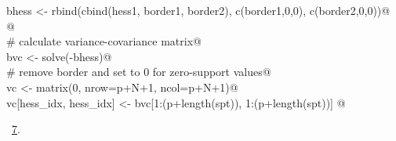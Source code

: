 \documentclass[reqno]{amsart}
\renewcommand{\NWlink}[2]{\hyperlink{#1}{#2}}
\begin{document}
\begin{flushleft}
\begin{list}{}{}
\mbox{}\verb@  bhess <- rbind(cbind(hess1, border1, border2), c(border1,0,0), c(border2,0,0))@\\
\mbox{}\verb@  @\\
\mbox{}\verb@  # calculate variance-covariance matrix@\\
\mbox{}\verb@  bvc <- solve(-bhess)@\\
\mbox{}\verb@  # remove border and set to 0 for zero-support values@\\
\mbox{}\verb@  vc <- matrix(0, nrow=p+N+1, ncol=p+N+1)@\\
\mbox{}\verb@  vc[hess_idx, hess_idx] <- bvc[1:(p+length(spt)), 1:(p+length(spt))]     @\\
\mbox{}\verb@@{\NWsep}
\end{list}
\vspace{-1.5ex}
\footnotesize
\begin{list}{}{\setlength{\itemsep}{-\parsep}\setlength{\itemindent}{-\leftmargin}}
\item \NWtxtMacroRefIn\ \NWlink{nuweb7}{7}.

\item{}
\end{list}
\vspace{4ex}
\end{flushleft}
\end{document}
